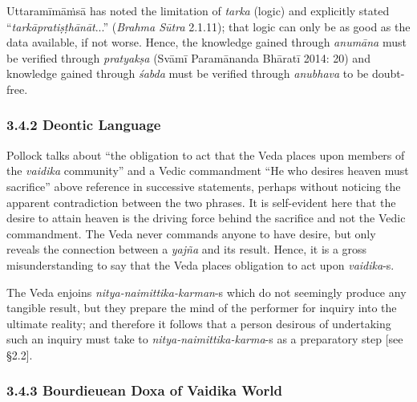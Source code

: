 Uttaramīmāṁsā has noted the limitation of \textit{tarka} (logic) and explicitly stated “\textit{tarkāpratiṣṭhānāt}...” (\textit{Brahma Sūtra} 2.1.11); that logic can only be as good as the data available, if not worse. Hence, the knowledge gained through \textit{anumāna} must be verified through \textit{pratyakṣa} (Svāmī Paramānanda Bhāratī 2014: 20) and knowledge gained through \textit{śabda} must be verified through \textit{anubhava} to be doubt-free.


\subsubsection*{3.4.2 Deontic Language}

Pollock talks about “the obligation to act that the Veda places upon members of the \textit{vaidika} community” and a Vedic commandment “He who desires heaven must sacrifice” above reference in successive statements, perhaps without noticing the apparent contradiction between the two phrases. It is self-evident here that the desire to attain heaven is the driving force behind the sacrifice and not the Vedic commandment. The Veda never commands anyone to have desire, but only reveals the connection between a \textit{yajña} and its result. Hence, it is a gross misunderstanding to say that the Veda places obligation to act upon \textit{vaidika}-s.

The Veda enjoins \textit{nitya-naimittika-karman}-s which do not seemingly produce any tangible result, but they prepare the mind of the performer for inquiry into the ultimate reality; and therefore it follows that a person desirous of undertaking such an inquiry must take to \textit{nitya-naimittika-karma}-s as a preparatory step [see §2.2].


\subsubsection*{3.4.3 Bourdieuean Doxa of Vaidika World}

